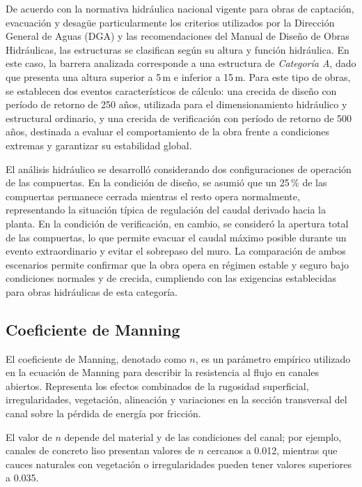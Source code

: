 \documentclass{article} %
\begin{document}
De acuerdo con la normativa hidráulica nacional vigente para obras de captación, evacuación y desagüe particularmente los criterios utilizados por la Dirección General de Aguas (DGA) y las recomendaciones del Manual de Diseño de Obras Hidráulicas, las estructuras se clasifican según su altura y función hidráulica. En este caso, la barrera analizada corresponde a una estructura de \textit{Categoría A}, dado que presenta una altura superior a 5\,m e inferior a 15\,m. Para este tipo de obras, se establecen dos eventos característicos de cálculo: una crecida de diseño con período de retorno de 250 años, utilizada para el dimensionamiento hidráulico y estructural ordinario, y una crecida de verificación con período de retorno de 500 años, destinada a evaluar el comportamiento de la obra frente a condiciones extremas y garantizar su estabilidad global.

El análisis hidráulico se desarrolló considerando dos configuraciones de operación de las compuertas. En la condición de diseño, se asumió que un 25\,\% de las compuertas permanece cerrada mientras el resto opera normalmente, representando la situación típica de regulación del caudal derivado hacia la planta. En la condición de verificación, en cambio, se consideró la apertura total de las compuertas, lo que permite evacuar el caudal máximo posible durante un evento extraordinario y evitar el sobrepaso del muro. La comparación de ambos escenarios permite confirmar que la obra opera en régimen estable y seguro bajo condiciones normales y de crecida, cumpliendo con las exigencias establecidas para obras hidráulicas de esta categoría.

\subsection*{Coeficiente de Manning}

El coeficiente de Manning, denotado como $n$, es un parámetro empírico utilizado en la ecuación de Manning para describir la resistencia al flujo en canales abiertos. Representa los efectos combinados de la rugosidad superficial, irregularidades, vegetación, alineación y variaciones en la sección transversal del canal sobre la pérdida de energía por fricción.

El valor de $n$ depende del material y de las condiciones del canal; por ejemplo, canales de concreto liso presentan valores de $n$ cercanos a 0.012, mientras que cauces naturales con vegetación o irregularidades pueden tener valores superiores a 0.035.
\end{document}
